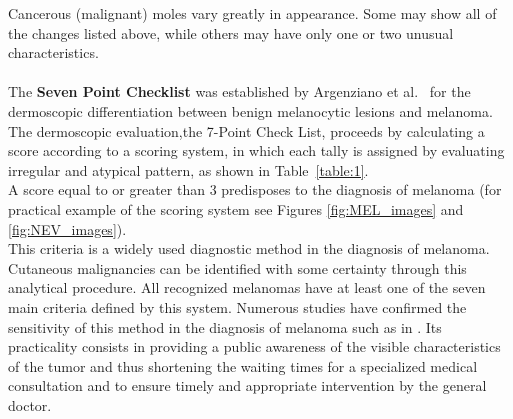 Cancerous (malignant) moles vary greatly in appearance. Some may show all of the changes listed above, while others may have only one or two unusual characteristics\cite{melanoma1}. \\ \\
\label{7ptRule}
The \textbf{Seven Point Checklist} was established by Argenziano et al.~\cite{Derm7ptData} for the dermoscopic differentiation between benign melanocytic lesions and melanoma. 
The dermoscopic evaluation,the 7-Point Check List, proceeds by calculating a score according to a scoring system, in which each tally is  assigned by evaluating irregular and atypical pattern, as shown in Table~\ref{table:1}.\\
A score equal to or greater than 3 predisposes to the diagnosis of melanoma (for practical example of the scoring system see Figures \ref{fig:MEL_images} and \ref{fig:NEV_images}).\\
This criteria is a widely used diagnostic method in the diagnosis of melanoma. Cutaneous malignancies can be identified with some certainty through this analytical procedure. All recognized melanomas have at least one of the seven main criteria defined by this system.
Numerous studies have confirmed the sensitivity of this method in the diagnosis of melanoma such as in \cite{7ptGeneralPractice}.
Its practicality consists in providing a public awareness of the visible characteristics of the tumor and thus shortening the waiting times for a specialized medical consultation and to ensure timely and appropriate intervention by the general doctor.


